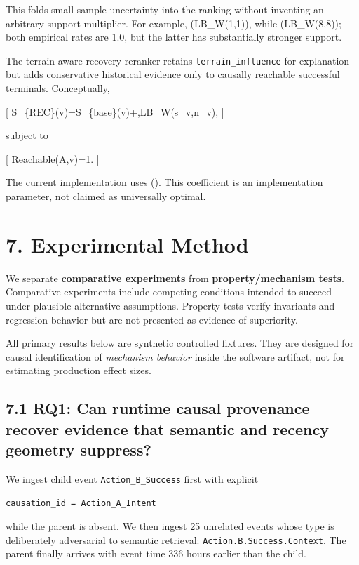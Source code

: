 \documentclass[
  11pt,
]{article}
\begin{document}
This folds small-sample uncertainty into the ranking without inventing
an arbitrary support multiplier. For example, (LB\_W(1,1)),
while (LB\_W(8,8)); both empirical rates are 1.0, but the
latter has substantially stronger support.

The terrain-aware recovery reranker retains \texttt{terrain\_influence}
for explanation but adds conservative historical evidence only to
causally reachable successful terminals. Conceptually,

{[} S\_\{REC\}(v)=S\_\{base\}(v)+\lambda,LB\_W(s\_v,n\_v), {]}

subject to

{[} Reachable(A,v)=1. {]}

The current implementation uses (). This coefficient is an
implementation parameter, not claimed as universally optimal.

\section{7. Experimental Method}\label{experimental-method}

We separate \textbf{comparative experiments} from
\textbf{property/mechanism tests}. Comparative experiments include
competing conditions intended to succeed under plausible alternative
assumptions. Property tests verify invariants and regression behavior
but are not presented as evidence of superiority.

All primary results below are synthetic controlled fixtures. They are
designed for causal identification of \emph{mechanism behavior} inside
the software artifact, not for estimating production effect sizes.

\subsection{7.1 RQ1: Can runtime causal provenance recover evidence that
semantic and recency geometry
suppress?}\label{rq1-can-runtime-causal-provenance-recover-evidence-that-semantic-and-recency-geometry-suppress}

We ingest child event \texttt{Action\_B\_Success} first with explicit

\begin{verbatim}
causation_id = Action_A_Intent
\end{verbatim}

while the parent is absent. We then ingest 25 unrelated events whose
type is deliberately adversarial to semantic retrieval:
\texttt{Action.B.Success.Context}. The parent finally arrives with event
time 336 hours earlier than the child.
\end{document}
